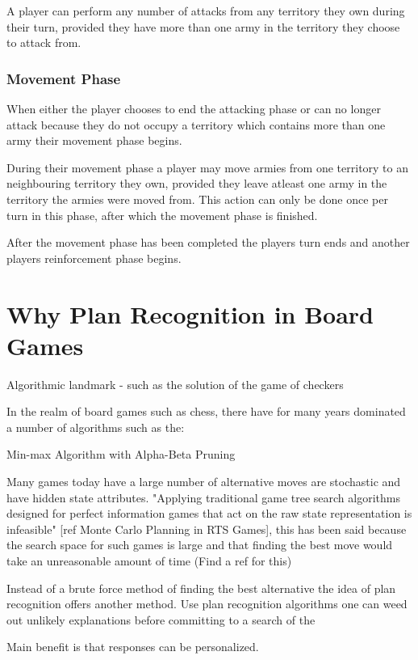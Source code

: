\documentclass[parskip]{cs4rep}
\begin{document}
A player can perform any number of attacks from any territory they own during their turn, provided they have more than one army in the territory they choose to attack from.

\subsubsection{Movement Phase}

When either the player chooses to end the attacking phase or can no longer attack because they do not occupy a territory which contains more than one army their movement phase begins.

During their movement phase a player may move armies from one territory to an neighbouring territory they own, provided they leave atleast one army in the territory the armies were moved from. This action can only be done once per turn in this phase, after which the movement phase is finished.

After the movement phase has been completed the players turn ends and another players reinforcement phase begins.
\newpage

\section{Why Plan Recognition in Board Games}

Algorithmic landmark - such as the solution of the game of checkers 

In the realm of board games such as chess, there have for many years dominated a number of algorithms such as the:

Min-max Algorithm with Alpha-Beta Pruning

Many games today have a large number of alternative moves are stochastic and have hidden state attributes. "Applying traditional game tree search algorithms designed for perfect information games that act on the raw state representation is infeasible" [ref Monte Carlo Planning in RTS Games], this has been said because the search space for such games is large and that finding the best move would take an unreasonable amount of time (Find a ref for this)

Instead of a brute force method of finding the best alternative the idea of plan recognition offers another method. Use plan recognition algorithms one can weed out unlikely explanations before committing to a search of the 

Main benefit is that responses can be personalized.
\end{document}
